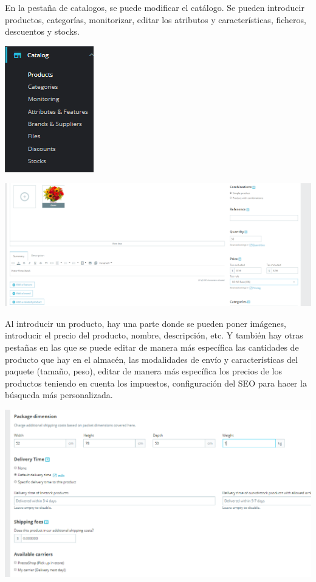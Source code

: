 \documentclass{article}
\begin{document}
En la pestaña de catalogos, se puede modificar el catálogo. Se pueden introducir productos, categorías, monitorizar, editar los atributos y características, ficheros, descuentos y stocks.

\begin{center}
\includegraphics[scale=0.8]{images/catalogo.png}
\end{center}

\begin{center}
\includegraphics[scale=0.8]{images/ejemplo.png}
\end{center}

Al introducir un producto, hay una parte donde se pueden poner imágenes, introducir el precio del producto, nombre, descripción, etc. Y también hay otras pestañas en las que se puede editar de manera más específica las cantidades de producto que hay en el almacén, las modalidades de envío y características del paquete (tamaño, peso), editar de manera más específica los precios de los productos teniendo en cuenta los impuestos, configuración del SEO para hacer la búsqueda más personalizada.

\begin{center}
\includegraphics[scale=0.4]{images/paquete.png}
\end{center}
\end{document}

